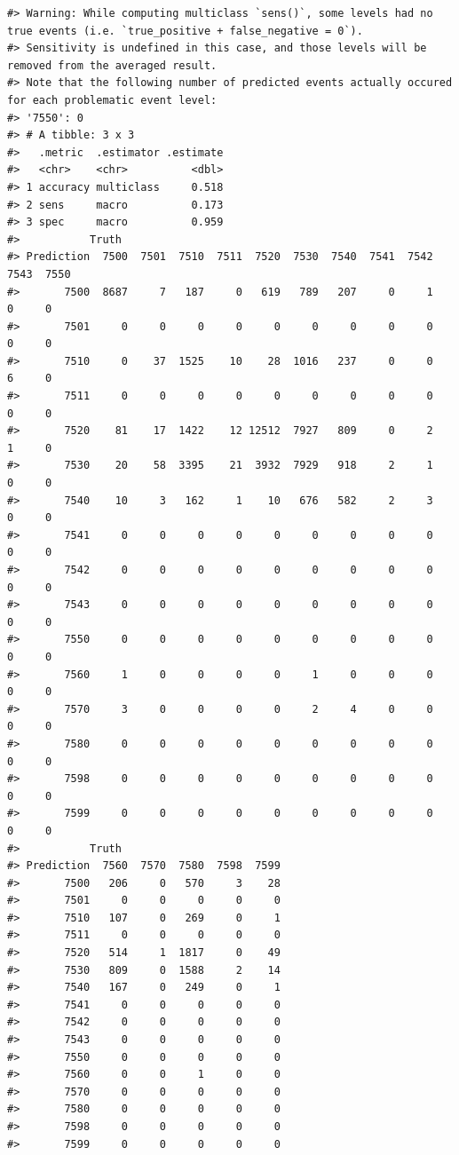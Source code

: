 \documentclass[
  letterpaper,
  DIV=11,
  numbers=noendperiod]{scrreprt}
\begin{document}
\begin{verbatim}
#> Warning: While computing multiclass `sens()`, some levels had no true events (i.e. `true_positive + false_negative = 0`). 
#> Sensitivity is undefined in this case, and those levels will be removed from the averaged result.
#> Note that the following number of predicted events actually occured for each problematic event level:
#> '7550': 0
#> # A tibble: 3 x 3
#>   .metric  .estimator .estimate
#>   <chr>    <chr>          <dbl>
#> 1 accuracy multiclass     0.518
#> 2 sens     macro          0.173
#> 3 spec     macro          0.959
#>           Truth
#> Prediction  7500  7501  7510  7511  7520  7530  7540  7541  7542  7543  7550
#>       7500  8687     7   187     0   619   789   207     0     1     0     0
#>       7501     0     0     0     0     0     0     0     0     0     0     0
#>       7510     0    37  1525    10    28  1016   237     0     0     6     0
#>       7511     0     0     0     0     0     0     0     0     0     0     0
#>       7520    81    17  1422    12 12512  7927   809     0     2     1     0
#>       7530    20    58  3395    21  3932  7929   918     2     1     0     0
#>       7540    10     3   162     1    10   676   582     2     3     0     0
#>       7541     0     0     0     0     0     0     0     0     0     0     0
#>       7542     0     0     0     0     0     0     0     0     0     0     0
#>       7543     0     0     0     0     0     0     0     0     0     0     0
#>       7550     0     0     0     0     0     0     0     0     0     0     0
#>       7560     1     0     0     0     0     1     0     0     0     0     0
#>       7570     3     0     0     0     0     2     4     0     0     0     0
#>       7580     0     0     0     0     0     0     0     0     0     0     0
#>       7598     0     0     0     0     0     0     0     0     0     0     0
#>       7599     0     0     0     0     0     0     0     0     0     0     0
#>           Truth
#> Prediction  7560  7570  7580  7598  7599
#>       7500   206     0   570     3    28
#>       7501     0     0     0     0     0
#>       7510   107     0   269     0     1
#>       7511     0     0     0     0     0
#>       7520   514     1  1817     0    49
#>       7530   809     0  1588     2    14
#>       7540   167     0   249     0     1
#>       7541     0     0     0     0     0
#>       7542     0     0     0     0     0
#>       7543     0     0     0     0     0
#>       7550     0     0     0     0     0
#>       7560     0     0     1     0     0
#>       7570     0     0     0     0     0
#>       7580     0     0     0     0     0
#>       7598     0     0     0     0     0
#>       7599     0     0     0     0     0
\end{verbatim}
\end{document}

